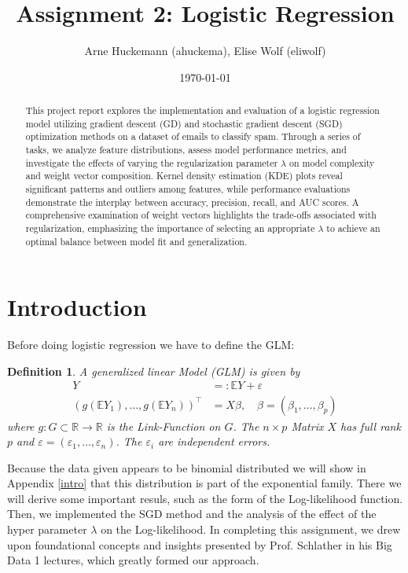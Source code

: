 \documentclass[a4paper,oneside,bibliography=totoc]{scrartcl}
\let\cite\citep
\newtheorem{defn}{Definition}[section] %
\begin{document}
\subject{Report - Machine Learning (HWS 2024)} %
\title{Assignment 2: Logistic Regression}
\author{Arne Huckemann (ahuckema), Elise Wolf (eliwolf)}
\date{\today}
\maketitle


\begin{abstract}
This project report explores the implementation and evaluation of a logistic regression model utilizing gradient descent (GD) and stochastic gradient descent (SGD) optimization methods on a dataset of emails to classify spam. Through a series of tasks, we analyze feature distributions, assess model performance metrics, and investigate the effects of varying the regularization parameter $\lambda$ on model complexity and weight vector composition. Kernel density estimation (KDE) plots reveal significant patterns and outliers among features, while performance evaluations demonstrate the interplay between accuracy, precision, recall, and AUC scores. A comprehensive examination of weight vectors highlights the trade-offs associated with regularization, emphasizing the importance of selecting an appropriate $\lambda$ to achieve an optimal balance between model fit and generalization.
\end{abstract}


\section{Introduction}
\label{ch:intro}
Before doing logistic regression we have to define the GLM:
\begin{defn}
    A generalized linear Model (GLM) is given by
$$
\begin{aligned}
Y & =:\mathbb{E} Y+\varepsilon \\
\left(g\left(\mathbb{E} Y_1\right), \ldots, g\left(\mathbb{E} Y_n\right)\right)^{\top} & =X \beta, \quad \beta=\left(\beta_1, \ldots, \beta_p\right)
\end{aligned}
$$
where $g: G \subset \mathbb{R} \rightarrow \mathbb{R}$ is the Link-Function on $G$. The $n \times p$ Matrix $X$ has full rank $p$ and $\varepsilon=\left(\varepsilon_1, \ldots, \varepsilon_n\right)$. The $\varepsilon_i$ are independent errors.
\end{defn}
Because the data given appears to be binomial distributed we will show in Appendix \ref{intro} that this distribution is part of the exponential family. There we will derive some important resuls, such as the form of the Log-likelihood function. Then, we implemented the SGD method and the analysis of the effect of the hyper parameter $\lambda$ on the Log-likelihood. In completing this assignment, we drew upon foundational concepts and insights presented by Prof. Schlather in his Big Data 1 lectures, which greatly formed our approach. \cite{schlather}
\end{document}
